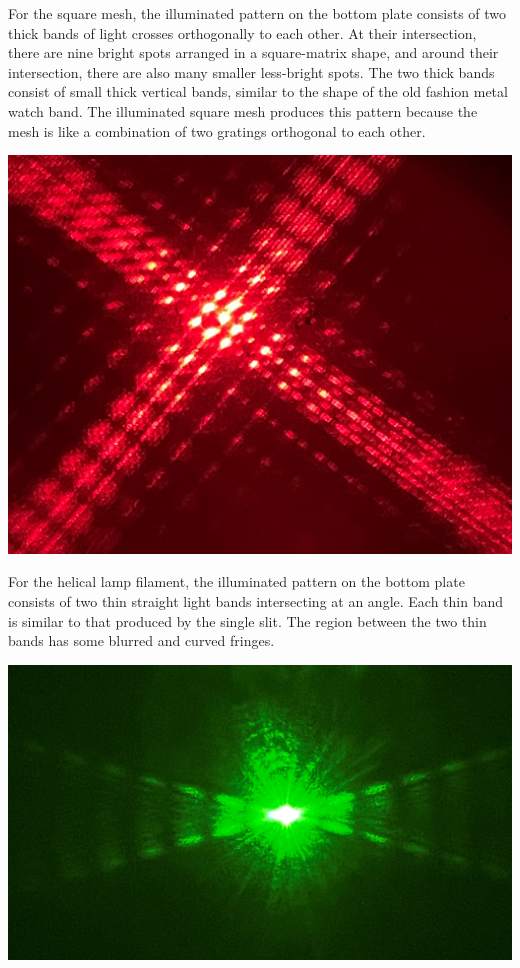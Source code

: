 \documentclass[11pt]{book}
\theoremstyle{break}
\theoremstyle{break}
\begin{document}
For the square mesh, the illuminated pattern on the bottom plate consists of two thick bands of light crosses orthogonally to each other. At their intersection, there are nine bright spots arranged in a square-matrix shape, and around their intersection, there are also many smaller less-bright spots. The two thick bands consist of small thick vertical bands, similar to the shape of the old fashion metal watch band. The illuminated square mesh produces this pattern because the mesh is like a combination of two gratings orthogonal to each other. 
\begin{center}
\includegraphics[scale=0.08]{mesh.jpg}
\end{center}


For the helical lamp filament, the illuminated pattern on the bottom plate consists of two thin straight light bands intersecting at an angle. Each thin band is similar to that produced by the single slit. The region between the two thin bands has some blurred and curved fringes. 
\begin{center}
\includegraphics[scale=0.13]{helix.jpg}
\end{center}
\end{document}
